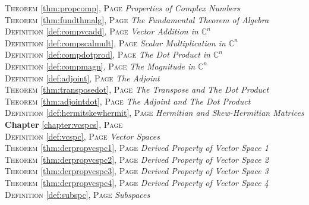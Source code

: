 \begin{multicols}{2}
{\textsc{Theorem} \ref{thm:propcomp}, \textsc{Page} \pageref{thm:propcomp} \textit{Properties of Complex Numbers} \\
\textsc{Theorem} \ref{thm:fundthmalg}, \textsc{Page} \pageref{thm:fundthmalg} \textit{The Fundamental Theorem of Algebra} \\
\textsc{Definition} \ref{def:compvcadd}, \textsc{Page} \pageref{def:compvcadd} \textit{Vector Addition in \(\mathbb {C}^n\)} \\
\textsc{Definition} \ref{def:compscalmult}, \textsc{Page} \pageref{def:compscalmult} \textit{Scalar Multiplication in \(\mathbb {C}^n\)} \\
\textsc{Definition} \ref{def:compdotprod}, \textsc{Page} \pageref{def:compdotprod} \textit{The Dot Product in \(\mathbb {C}^n\)} \\
\textsc{Definition} \ref{def:compmagn}, \textsc{Page} \pageref{def:compmagn} \textit{The Magnitude in \(\mathbb {C}^n\)} \\
\textsc{Definition} \ref{def:adjoint}, \textsc{Page} \pageref{def:adjoint} \textit{The Adjoint} \\
\textsc{Theorem} \ref{thm:transposedot}, \textsc{Page} \pageref{thm:transposedot} \textit{The Transpose and The Dot Product} \\
\textsc{Theorem} \ref{thm:adjointdot}, \textsc{Page} \pageref{thm:adjointdot} \textit{The Adjoint and The Dot Product} \\
\textsc{Definition} \ref{def:hermitskewhermit}, \textsc{Page} \pageref{def:hermitskewhermit} \textit{Hermitian and Skew-Hermitian Matrices} \\
\textbf{Chapter} \ref{chapter:vcspcs}, \textsc{Page} \pageref{chapter:vcspcs} \\
\textsc{Definition} \ref{def:vcspc}, \textsc{Page} \pageref{def:vcspc} \textit{Vector Spaces} \\
\textsc{Theorem} \ref{thm:derpropvcspc1}, \textsc{Page} \pageref{thm:derpropvcspc1} \textit{Derived Property of Vector Space 1} \\
\textsc{Theorem} \ref{thm:derpropvcspc2}, \textsc{Page} \pageref{thm:derpropvcspc2} \textit{Derived Property of Vector Space 2} \\
\textsc{Theorem} \ref{thm:derpropvcspc3}, \textsc{Page} \pageref{thm:derpropvcspc3} \textit{Derived Property of Vector Space 3} \\
\textsc{Theorem} \ref{thm:derpropvcspc4}, \textsc{Page} \pageref{thm:derpropvcspc4} \textit{Derived Property of Vector Space 4} \\
\textsc{Definition} \ref{def:subspc}, \textsc{Page} \pageref{def:subspc} \textit{Subspaces} \\
}
\end{multicols}

